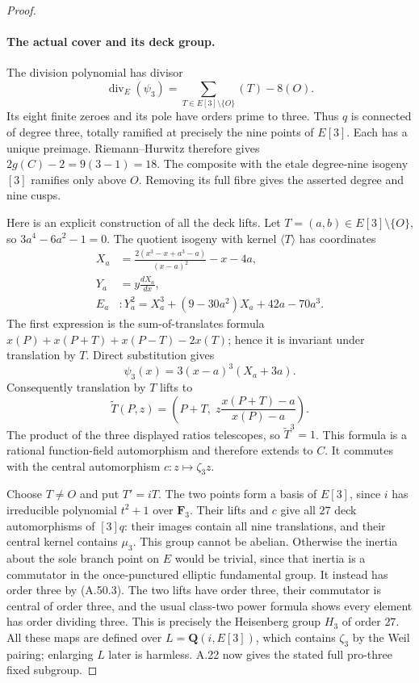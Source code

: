 \begin{proof}
\paragraph{The actual cover and its deck group.}
The division polynomial has divisor
\[
 \operatorname{div}_E(\psi_3)
       =\sum_{T\in E[3]\setminus\{O\}}(T)-8(O).
                                                               \tag{A.50.3}
\]
Its eight finite zeroes and its pole have orders prime
to three. Thus \(q\) is connected of degree three,
totally ramified at precisely the nine points of
\(E[3]\). Each has a unique preimage. Riemann--Hurwitz
therefore gives \(2g(C)-2=9(3-1)=18\).
The composite with the etale degree-nine isogeny
\([3]\) ramifies only above \(O\). Removing its
full fibre gives the asserted degree and nine cusps.

Here is an explicit construction of all the deck lifts.
Let \(T=(a,b)\in E[3]\setminus\{O\}\), so
\(3a^4-6a^2-1=0\). The quotient isogeny with kernel
\(\langle T\rangle\) has coordinates
\[
 \begin{split}
 X_a&=\frac{2(x^3-x+a^3-a)}{(x-a)^2}-x-4a,\\
 Y_a&=y\frac{dX_a}{dx},\\
 E_a&:Y_a^2=X_a^3+(9-30a^2)X_a+42a-70a^3.
 \end{split}                                                   \tag{A.50.4}
\]
The first expression is the sum-of-translates formula
\(x(P)+x(P+T)+x(P-T)-2x(T)\); hence it is invariant
under translation by \(T\). Direct substitution gives
\[
               \psi_3(x)=3(x-a)^3(X_a+3a).          \tag{A.50.5}
\]
Consequently translation by \(T\) lifts to
\[
       \widetilde T(P,z)=
       \left(P+T,\;z\frac{x(P+T)-a}{x(P)-a}\right).
                                                               \tag{A.50.6}
\]
The product of the three displayed ratios telescopes,
so \(\widetilde T^3=1\). This formula is a rational
function-field automorphism and therefore extends to
\(C\). It commutes with the central automorphism
\(c:z\mapsto\zeta_3z\).

Choose \(T\ne O\) and put \(T'=iT\). The two
points form a basis of \(E[3]\), since \(i\) has
irreducible polynomial \(t^2+1\) over \(\mathbf F_3\).
Their lifts and \(c\) give all \(27\) deck
automorphisms of \([3]q\): their images contain all
nine translations, and their central kernel contains
\(\mu_3\). This group cannot be abelian. Otherwise
the inertia about the sole branch point on \(E\)
would be trivial, since that inertia is a commutator
in the once-punctured elliptic fundamental group.
It instead has order three by (A.50.3).
The two lifts have order three, their commutator is
central of order three, and the usual class-two
power formula shows every element has order dividing
three. This is precisely the Heisenberg group
\(H_3\) of order \(27\).
All these maps are defined over
\(L=\mathbf Q(i,E[3])\), which contains \(\zeta_3\)
by the Weil pairing; enlarging \(L\) later is harmless.
A.22 now gives the stated full pro-three fixed subgroup.


\end{proof}
